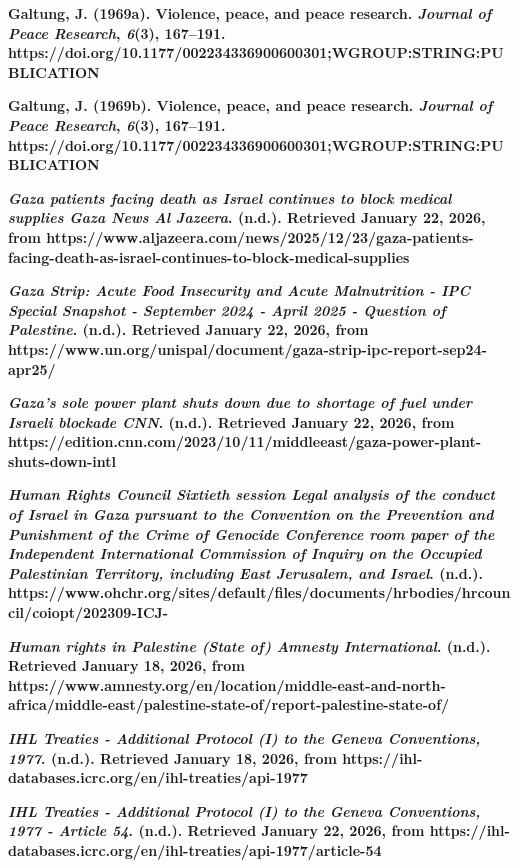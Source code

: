 \textbf{Galtung, J. (1969a). Violence, peace, and peace research.
\emph{Journal of Peace Research}, \emph{6}(3), 167--191.
https://doi.org/10.1177/002234336900600301;WGROUP:STRING:PUBLICATION}

\textbf{Galtung, J. (1969b). Violence, peace, and peace research.
\emph{Journal of Peace Research}, \emph{6}(3), 167--191.
https://doi.org/10.1177/002234336900600301;WGROUP:STRING:PUBLICATION}

\textbf{\emph{Gaza patients facing death as Israel continues to block
medical supplies \textbar{} Gaza News \textbar{} Al Jazeera}. (n.d.).
Retrieved January 22, 2026, from
https://www.aljazeera.com/news/2025/12/23/gaza-patients-facing-death-as-israel-continues-to-block-medical-supplies}

\textbf{\emph{Gaza Strip: Acute Food Insecurity and Acute Malnutrition -
IPC Special Snapshot - September 2024 - April 2025 - Question of
Palestine}. (n.d.). Retrieved January 22, 2026, from
https://www.un.org/unispal/document/gaza-strip-ipc-report-sep24-apr25/}

\textbf{\emph{Gaza's sole power plant shuts down due to shortage of fuel
under Israeli blockade \textbar{} CNN}. (n.d.). Retrieved January 22,
2026, from
https://edition.cnn.com/2023/10/11/middleeast/gaza-power-plant-shuts-down-intl}

\textbf{\emph{Human Rights Council Sixtieth session Legal analysis of
the conduct of Israel in Gaza pursuant to the Convention on the
Prevention and Punishment of the Crime of Genocide Conference room paper
of the Independent International Commission of Inquiry on the Occupied
Palestinian Territory, including East Jerusalem, and Israel}. (n.d.).
https://www.ohchr.org/sites/default/files/documents/hrbodies/hrcouncil/coiopt/202309-ICJ-}

\textbf{\emph{Human rights in Palestine (State of) Amnesty
International}. (n.d.). Retrieved January 18, 2026, from
https://www.amnesty.org/en/location/middle-east-and-north-africa/middle-east/palestine-state-of/report-palestine-state-of/}

\textbf{\emph{IHL Treaties - Additional Protocol (I) to the Geneva
Conventions, 1977}. (n.d.). Retrieved January 18, 2026, from
https://ihl-databases.icrc.org/en/ihl-treaties/api-1977}

\textbf{\emph{IHL Treaties - Additional Protocol (I) to the Geneva
Conventions, 1977 - Article 54}. (n.d.). Retrieved January 22, 2026,
from https://ihl-databases.icrc.org/en/ihl-treaties/api-1977/article-54}

